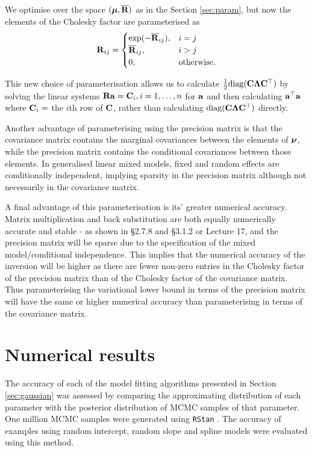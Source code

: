 We optimise over the space $({\boldsymbol \mu}, \overline{{\bf R}})$ as in the Section
\ref{sec:param}, but now the elements of the Cholesky factor are parameterised
as
\begin{equation*}
\label{eq:cholesky_element_precision_param}
	{\bf R}_{ij} =
	\begin{cases}
		\exp(-\overline{{\bf R}}_{ij}), & i = j             \\
		\overline{{\bf R}}_{ij},        & i > j             \\
		0,                          & \text{otherwise}.
	\end{cases}
\end{equation*}
	
\noindent This new choice of parameterisation allows us to calculate
$\frac{1}{2} \text{diag}({\bf C} {\boldsymbol \Lambda} {\bf C}^\top)$ by solving the linear systems
${\bf R} {\bf a} = {\bf C}_{i}, i=1, \ldots, n$ for   ${\bf a}$ and then calculating
${\bf a}^\top{\bf a}$ where ${\bf C}_{i} = $ the $i$th row of ${\bf C}$, rather than
calculating $\text{diag}({\bf C} {\boldsymbol \Lambda} {\bf C}^\top)$ directly.
	
Another advantage of parameterising using the precision matrix is that
the covariance matrix contains the marginal covariances between the elements of
${\boldsymbol \nu}$, while the precision matrix contains the conditional covariances
between those elements. In generalised linear mixed models, fixed and random
effects are conditionally independent, implying sparsity in the precision
matrix although not necessarily in the covariance matrix.

A final advantage of this parameterisation is its' greater numerical accuracy.
Matrix multiplication and back substitution are both equally numerically
accurate and stable - as shown in \cite{Golub:1996:MC:248979} \S2.7.8 and
\S3.1.2 or \cite{trefethen97} Lecture 17, and the precision matrix will be
sparse due to the specification of the mixed model/conditional independence.
This implies that the numerical accuracy of the inversion will be higher as
there are fewer non-zero entries in the Cholesky factor of the precision matrix
than of the Cholesky factor of the covariance matrix. Thus parameterising the
variational lower bound in terms of the precision matrix will have the same or
higher numerical accuracy than parameterising in terms of the covariance
matrix.

\section{Numerical results}
\label{sec:results}
The accuracy of each of the model fitting algorithms presented in Section
\ref{sec:gaussian} was assessed by comparing the approximating distribution of
each parameter with the posterior distribution of MCMC
samples of that parameter. One million MCMC samples were
generated using \texttt{RStan} \citep{Carpenter2016, StanDevelopmentTeam2016}.
The accuracy of examples using random intercept, random slope and spline models
were evaluated using this method.

